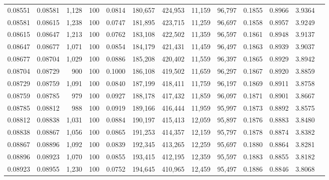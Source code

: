 \begin{tabular}{rrrrrrrrrrrrr}
0.08551 & 0.08581 & 1,128 & 100 &                                     0.0814 & 180,657 & 424,953 &  11,159 &  96,797 & 0.1855 & 0.8966 & 3.9364 \\
0.08581 & 0.08615 & 1,238 & 100 &                                     0.0747 & 181,895 & 423,715 &  11,259 &  96,697 & 0.1858 & 0.8957 & 3.9249 \\
0.08615 & 0.08647 & 1,213 & 100 &                                     0.0762 & 183,108 & 422,502 &  11,359 &  96,597 & 0.1861 & 0.8948 & 3.9137 \\
0.08647 & 0.08677 & 1,071 & 100 &                                     0.0854 & 184,179 & 421,431 &  11,459 &  96,497 & 0.1863 & 0.8939 & 3.9037 \\
0.08677 & 0.08704 & 1,029 & 100 &                                     0.0886 & 185,208 & 420,402 &  11,559 &  96,397 & 0.1865 & 0.8929 & 3.8942 \\
0.08704 & 0.08729 &   900 & 100 &                                     0.1000 & 186,108 & 419,502 &  11,659 &  96,297 & 0.1867 & 0.8920 & 3.8859 \\
0.08729 & 0.08759 & 1,091 & 100 &                                     0.0840 & 187,199 & 418,411 &  11,759 &  96,197 & 0.1869 & 0.8911 & 3.8758 \\
0.08759 & 0.08785 &   979 & 100 &                                     0.0927 & 188,178 & 417,432 &  11,859 &  96,097 & 0.1871 & 0.8901 & 3.8667 \\
0.08785 & 0.08812 &   988 & 100 &                                     0.0919 & 189,166 & 416,444 &  11,959 &  95,997 & 0.1873 & 0.8892 & 3.8575 \\
0.08812 & 0.08838 & 1,031 & 100 &                                     0.0884 & 190,197 & 415,413 &  12,059 &  95,897 & 0.1876 & 0.8883 & 3.8480 \\
0.08838 & 0.08867 & 1,056 & 100 &                                     0.0865 & 191,253 & 414,357 &  12,159 &  95,797 & 0.1878 & 0.8874 & 3.8382 \\
0.08867 & 0.08896 & 1,092 & 100 &                                     0.0839 & 192,345 & 413,265 &  12,259 &  95,697 & 0.1880 & 0.8864 & 3.8281 \\
0.08896 & 0.08923 & 1,070 & 100 &                                     0.0855 & 193,415 & 412,195 &  12,359 &  95,597 & 0.1883 & 0.8855 & 3.8182 \\
0.08923 & 0.08955 & 1,230 & 100 &                                     0.0752 & 194,645 & 410,965 &  12,459 &  95,497 & 0.1886 & 0.8846 & 3.8068 \\

\end{tabular}
